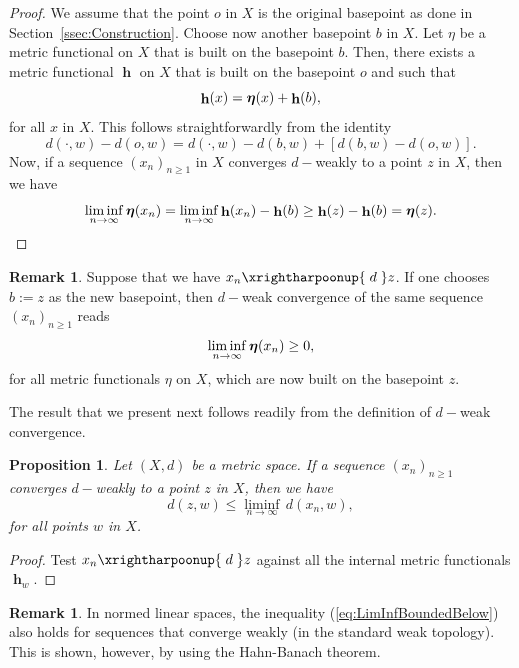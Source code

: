 \documentclass[a4paper,12pt]{article}
\newtheorem{prop}[thm]{Proposition}
\theoremstyle{definition}
\newtheorem{rem}[thm]{Remark}
\DeclareMathOperator{\h}{\mathbf{h}}
\numberwithin{equation}{section}
\begin{document}
\begin{proof}
We assume that the point $o$ in $X$ is the original basepoint as done in 
Section~\ref{ssec:Construction}. Choose now another basepoint $b$ in $X$. 
Let {\boldmath$\eta$} be a metric functional on $X$ that is built on the 
basepoint $b$. Then, there exists a metric functional $\h$ on $X$ that is 
built on the basepoint $o$ and such that 
$$
	\h(x) = \mbox{\boldmath$\eta$}(x) + \h(b),
$$
for all $x$ in $X$. This follows straightforwardly from the identity
$$
	d(\cdot,w) - d(o,w) = d(\cdot,w) - d(b,w) + [ d(b,w) - d(o,w)].
$$
Now, if a sequence $(x_n)_{n\geq 1}$ in $X$ converges $d-$weakly to a point $z$ 
in $X$, then we have
$$
	\liminf_{n\to\infty}\mbox{\boldmath$\eta$}(x_n) 
		= \liminf_{n\to\infty}\h(x_n) -\h(b)
		\geq \h(z) - \h(b) = \mbox{\boldmath$\eta$}(z).
$$ 
\end{proof} 

\begin{rem}
Suppose that we have $x_n \xrightharpoonup{\;d\;} z$. If one chooses $b:=z$ as the new 
basepoint, then $d-$weak convergence of the same sequence $(x_n)_{n\geq 1}$ reads 
$$
	\liminf_{n\to\infty}\mbox{\boldmath$\eta$}(x_n) \geq 0,
$$
for all metric functionals {\boldmath$\eta$} on $X$, which are now built on the 
basepoint $z$. 
\end{rem}

The result that we present next follows readily from the definition of $d-$weak 
convergence.

\begin{prop}
Let $(X,d)$ be a metric space. If a sequence $(x_n)_{n\geq 1}$ converges 
$d-$weakly to a point $z$ in $X$, then we have
\begin{equation}\label{eq:LimInfBoundedBelow}
	d(z,w) \leq \liminf_{n\to\infty}\,d(x_n,w),
\end{equation}
for all points $w$ in $X$.
\end{prop}

\begin{proof}
Test $x_n \xrightharpoonup{\;d\;} z$ against all the internal metric 
functionals $\h_w$.
\end{proof}

\begin{rem}
In normed linear spaces, the inequality (\ref{eq:LimInfBoundedBelow}) also holds
for sequences that converge weakly (in the standard weak 
topology). This is shown, however, by using the Hahn-Banach theorem.
\end{rem}
\end{document}
